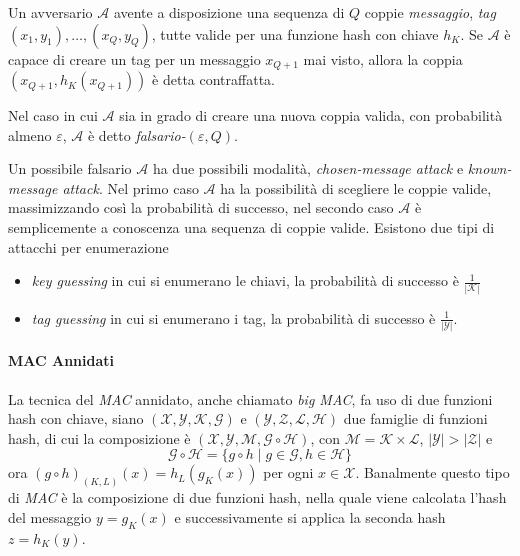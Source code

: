 \begin{definition}[Contraffazione]
    Un avversario $\mathcal{A}$ avente a disposizione una sequenza di $Q$ coppie \textit{messaggio}, \textit{tag} $(x_1,y_1),\dots,(x_Q,y_Q)$, tutte valide per una funzione hash con chiave $h_K$. Se $\mathcal{A}$ è capace di creare un tag per un messaggio $x_{Q+1}$ mai visto, allora la coppia $(x_{Q+1},h_K(x_{Q+1}))$ è detta contraffatta.
    
    \vspace{1em}\noindent
    Nel caso in cui $\mathcal{A}$ sia in grado di creare una nuova coppia valida, con probabilità almeno $\varepsilon$, $\mathcal{A}$ è detto \emph{falsario-}$(\varepsilon,Q)$. 
\end{definition}

Un possibile falsario $\mathcal{A}$ ha due possibili modalità, \emph{chosen-message attack} e \emph{known-message attack}. Nel primo caso $\mathcal{A}$ ha la possibilità di scegliere le coppie valide, massimizzando così la probabilità di successo, nel secondo caso $\mathcal{A}$ è semplicemente a conoscenza una sequenza di coppie valide. Esistono due tipi di attacchi per enumerazione
\begin{itemize}
    \item \emph{key guessing} in cui si enumerano le chiavi, la probabilità di successo è $\frac{1}{\mathcal{|K|}}$
    \item \emph{tag guessing} in cui si enumerano i tag, la probabilità di successo è $\frac{1}{\mathcal{|Y|}}$.
\end{itemize}

\paragraph{MAC Annidati}
La tecnica del \emph{MAC} annidato, anche chiamato \emph{big MAC}, fa uso di due funzioni hash con chiave, siano $(\mathcal{X},\mathcal{Y},\mathcal{K},\mathcal{G})$ e $(\mathcal{Y},\mathcal{Z},\mathcal{L},\mathcal{H})$ due famiglie di funzioni hash, di cui la composizione è $(\mathcal{X},\mathcal{Y},\mathcal{M},\mathcal{G} \circ  \mathcal{H})$, con $\mathcal{M} = \mathcal{K} \times \mathcal{L}$, $|\mathcal{Y}| > |\mathcal{Z}|$ e  
\[
    \mathcal{G} \circ \mathcal{H} = \{g \circ h \mid g \in \mathcal{G}, h \in \mathcal{H}\}
\]
ora $(g \circ h)_{(K,L)}(x) = h_L(g_K(x))$ per ogni $x \in \mathcal{X}$. Banalmente questo tipo di \emph{MAC} è la composizione di due funzioni hash, nella quale viene calcolata l'hash del messaggio $y = g_K(x)$ e successivamente si applica la seconda hash $z = h_K(y)$. 

